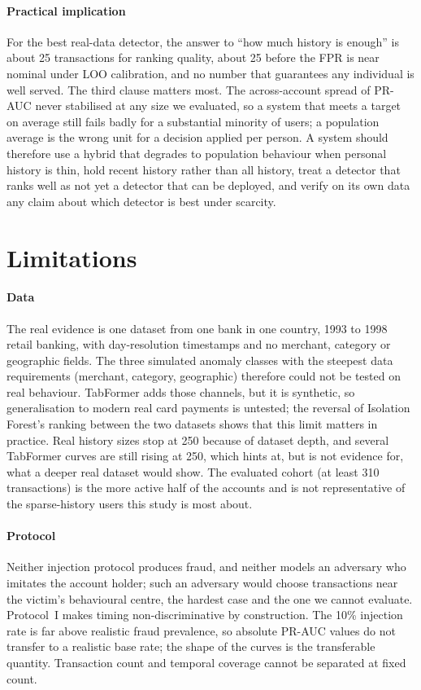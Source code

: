 \paragraph{Practical implication}
For the best real-data detector, the answer to ``how much history is enough'' is about 25 transactions for ranking quality, about 25 before the FPR is near nominal under LOO calibration, and no number that guarantees any individual is well served. The third clause matters most. The across-account spread of PR-AUC never stabilised at any size we evaluated, so a system that meets a target on average still fails badly for a substantial minority of users; a population average is the wrong unit for a decision applied per person. A system should therefore use a hybrid that degrades to population behaviour when personal history is thin, hold recent history rather than all history, treat a detector that ranks well as not yet a detector that can be deployed, and verify on its own data any claim about which detector is best under scarcity.

\section{Limitations}\label{sec:limits}

\paragraph{Data}
The real evidence is one dataset from one bank in one country, 1993 to 1998 retail banking, with day-resolution timestamps and no merchant, category or geographic fields. The three simulated anomaly classes with the steepest data requirements (merchant, category, geographic) therefore could not be tested on real behaviour. TabFormer adds those channels, but it is synthetic, so generalisation to modern real card payments is untested; the reversal of Isolation Forest's ranking between the two datasets shows that this limit matters in practice. Real history sizes stop at 250 because of dataset depth, and several TabFormer curves are still rising at 250, which hints at, but is not evidence for, what a deeper real dataset would show. The evaluated cohort (at least 310 transactions) is the more active half of the accounts and is not representative of the sparse-history users this study is most about.

\paragraph{Protocol}
Neither injection protocol produces fraud, and neither models an adversary who imitates the account holder; such an adversary would choose transactions near the victim's behavioural centre, the hardest case and the one we cannot evaluate. Protocol~I makes timing non-discriminative by construction. The 10\% injection rate is far above realistic fraud prevalence, so absolute PR-AUC values do not transfer to a realistic base rate; the shape of the curves is the transferable quantity. Transaction count and temporal coverage cannot be separated at fixed count.

